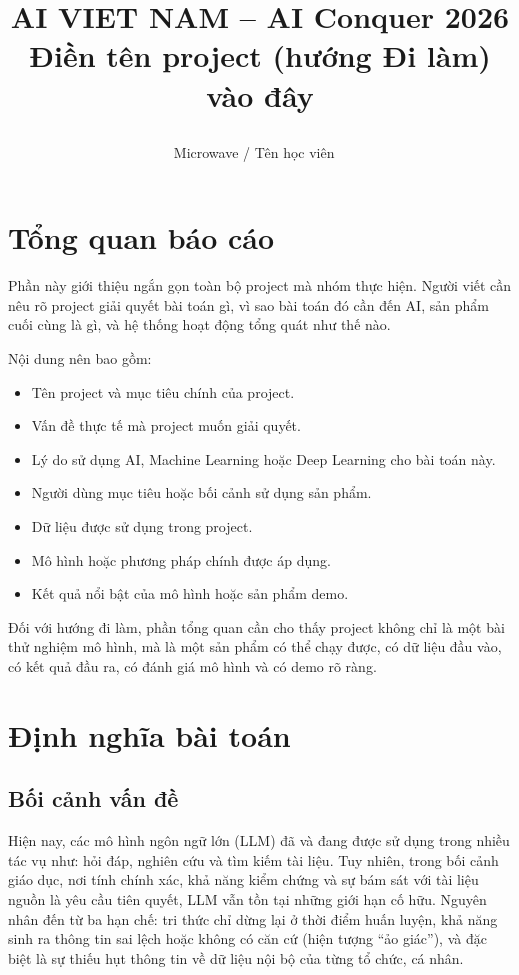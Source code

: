 \documentclass[12pt]{ai_conquer2026}
\title{%
  \begin{center}
        \Large {AI VIET NAM -- AI Conquer 2026}\\[.5ex]  
        \Huge \textbf{Điền tên project (hướng Đi làm) vào đây}\\[.5ex]
  \end{center}
}
\author{
\begin{minipage}{\textwidth}
\centering
{
\vspace{-1.5em}
Microwave / Tên học viên
}\
\end{minipage}
}
\date{}
\begin{document}
\maketitle
\vspace{-5.5em}
\setlength{\epigraphwidth}{0.6\textwidth}

\section{Tổng quan báo cáo}

Phần này giới thiệu ngắn gọn toàn bộ project mà nhóm thực hiện. Người viết cần nêu rõ project giải quyết bài toán gì, vì sao bài toán đó cần đến AI, sản phẩm cuối cùng là gì, và hệ thống hoạt động tổng quát như thế nào.

Nội dung nên bao gồm:
\begin{itemize}
\item Tên project và mục tiêu chính của project.
\item Vấn đề thực tế mà project muốn giải quyết.
\item Lý do sử dụng AI, Machine Learning hoặc Deep Learning cho bài toán này.
\item Người dùng mục tiêu hoặc bối cảnh sử dụng sản phẩm.
\item Dữ liệu được sử dụng trong project.
\item Mô hình hoặc phương pháp chính được áp dụng.
\item Kết quả nổi bật của mô hình hoặc sản phẩm demo.
\end{itemize}

Đối với hướng đi làm, phần tổng quan cần cho thấy project không chỉ là một bài thử nghiệm mô hình, mà là một sản phẩm có thể chạy được, có dữ liệu đầu vào, có kết quả đầu ra, có đánh giá mô hình và có demo rõ ràng.

\newpage
\setcounter{tocdepth}{2}
\tableofcontents
\thispagestyle{fancy}

\newpage
\section{Định nghĩa bài toán}

\subsection{Bối cảnh vấn đề}

Hiện nay, các mô hình ngôn ngữ lớn (LLM) đã và đang được sử dụng trong nhiều tác vụ như: hỏi đáp, nghiên cứu và tìm kiếm tài liệu. Tuy nhiên, trong bối cảnh giáo dục, nơi tính chính xác, khả năng kiểm chứng và sự bám sát với tài liệu nguồn là yêu cầu tiên quyết, LLM vẫn tồn tại những giới hạn cố hữu. Nguyên nhân đến từ ba hạn chế: tri thức chỉ dừng lại ở thời điểm huấn luyện, khả năng sinh ra thông tin sai lệch hoặc
không có căn cứ (hiện tượng “ảo giác”), và đặc biệt là sự thiếu hụt thông tin về dữ liệu nội bộ của từng tổ chức, cá nhân.
\end{document}
